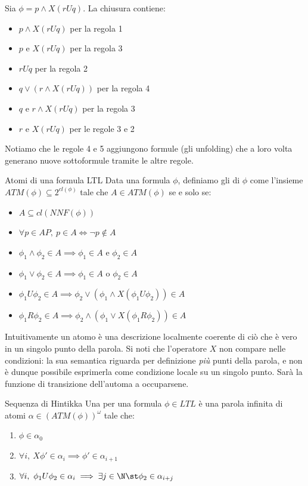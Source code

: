 \begin{example}{}
  Sia \(\phi=p\land X(rUq)\). La chiusura contiene:
  \begin{itemize}
    \item \(p\land X(rUq)\) per la regola 1
    \item \(p\) e \(X(rUq)\) per la regola 3
    \item \(rUq\) per la regola 2
    \item \(q \lor (r \land X(rUq))\) per la regola 4
    \item \(q\) e \(r \land X(rUq)\) per la regola 3
    \item \(r\) e \(X(rUq)\) per le regole 3 e 2
  \end{itemize}
  Notiamo che le regole 4 e 5 aggiungono formule (gli unfolding) che a loro volta generano nuove sottoformule tramite le altre regole.
\end{example}

\begin{definition}{Atomi di una formula LTL}
  Data una formula \(\phi\), definiamo gli  di \(\phi\) come l'insieme \(ATM(\phi)\subseteq 2^{cl(\phi)}\) tale che \(A \in ATM(\phi)\) se e solo se:
  \begin{itemize}
    \item \(A\subseteq cl(NNF(\phi))\)
    \item \(\forall p \in AP,\ p\in A \iff \neg p \notin A\)
    \item \(\phi_1 \land \phi_2 \in A \implies \phi_1 \in A \text{ e } \phi_2 \in A\)
    \item \(\phi_1 \lor \phi_2 \in A \implies \phi_1 \in A \text{ o } \phi_2 \in A\)
    \item \(\phi_1 U \phi_2 \in A \implies \phi_2 \lor (\phi_1 \land X(\phi_1 U \phi_2)) \in A\)
    \item \(\phi_1 R \phi_2 \in A \implies \phi_2 \land (\phi_1 \lor X(\phi_1 R \phi_2)) \in A\)
  \end{itemize}
\end{definition}

Intuitivamente un atomo è una descrizione localmente coerente di ciò che è vero in un singolo punto della parola. Si noti che l'operatore \(X\) non compare nelle condizioni: la sua semantica riguarda per definizione \emph{più} punti della parola, e non è dunque possibile esprimerla come condizione locale su un singolo punto. Sarà la funzione di transizione dell'automa a occuparsene.

\begin{definition}{Sequenza di Hintikka}
  Una  per una formula \(\phi\in LTL\) è una parola infinita di atomi \(\alpha \in {(ATM(\phi))}^\omega\) tale che:
  \begin{enumerate}
    \item \(\phi \in \alpha_0\)
    \item \(\forall i,\ X\phi' \in \alpha_i \implies \phi' \in \alpha_{i+1}\)
    \item \(\forall i,\ \phi_1U\phi_2 \in \alpha_i \implies \exists j \in \N\st\phi_2\in\alpha_{i+j}\)
  \end{enumerate}
\end{definition}

